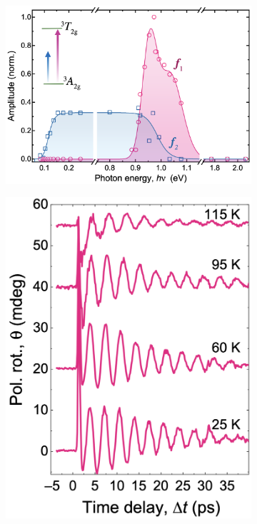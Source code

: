 \begin{figure}[ht]
    \centering
    \begin{subfigure}[b]{0.5\textwidth}
        \includegraphics[width=\textwidth]{pictures/9.png}
        \caption{}
        \label{fig:9}
    \end{subfigure}
    \hspace{0.3cm}
    \begin{subfigure}[b]{0.28\textwidth}
        \includegraphics[width=\textwidth]{pictures/10.png}

\end{subfigure}
\end{figure}
